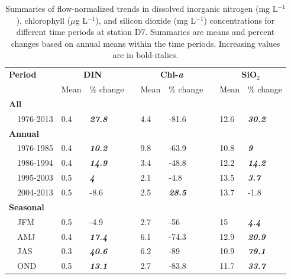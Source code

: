 \documentclass[letterpaper,12pt,oneside]{article}\usepackage[]{graphicx}\usepackage[]{color}
\begin{document}
\begin{table}[!tbp]
\caption{Summaries of flow-normalized trends in dissolved inorganic nitrogen (mg L$^{-1}$), chlorophyll ($\mu$g L$^{-1}$), and silicon dioxide (mg L$^{-1}$) concentrations for different time periods at station D7. Summaries are means and percent changes based on annual means within the time periods.  Increasing values are in bold-italics.\label{tab:d7chg}} 
\begin{center}
\begin{tabular}{lllcllcll}
\hline\hline
\multicolumn{1}{l}{\bfseries Period}&\multicolumn{2}{c}{\bfseries DIN}&\multicolumn{1}{c}{\bfseries }&\multicolumn{2}{c}{\bfseries Chl-\textit{a}}&\multicolumn{1}{c}{\bfseries }&\multicolumn{2}{c}{\bfseries SiO$_2$}\tabularnewline
\cline{2-3} \cline{5-6} \cline{8-9}
\multicolumn{1}{l}{}&\multicolumn{1}{c}{Mean}&\multicolumn{1}{c}{\% change}&\multicolumn{1}{c}{}&\multicolumn{1}{c}{Mean}&\multicolumn{1}{c}{\% change}&\multicolumn{1}{c}{}&\multicolumn{1}{c}{Mean}&\multicolumn{1}{c}{\% change}\tabularnewline
\hline
{\bfseries All}&&&&&&&&\tabularnewline
~~1976-2013&0.4&\textit{\textbf{27.8}}&&4.4&-81.6&&12.6&\textit{\textbf{30.2}}\tabularnewline
\hline
{\bfseries Annual}&&&&&&&&\tabularnewline
~~1976-1985&0.4&\textit{\textbf{10.2}}&&9.8&-63.9&&10.8&\textit{\textbf{9}}\tabularnewline
~~1986-1994&0.4&\textit{\textbf{14.9}}&&3.4&-48.8&&12.2&\textit{\textbf{14.2}}\tabularnewline
~~1995-2003&0.5&\textit{\textbf{4}}&&2.1&-4.8&&13.5&\textit{\textbf{3.7}}\tabularnewline
~~2004-2013&0.5&-8.6&&2.5&\textit{\textbf{28.5}}&&13.7&-1.8\tabularnewline
\hline
{\bfseries Seasonal}&&&&&&&&\tabularnewline
~~JFM&0.5&-4.9&&2.7&-56&&15&\textit{\textbf{4.4}}\tabularnewline
~~AMJ&0.4&\textit{\textbf{17.4}}&&6.1&-74.3&&12.9&\textit{\textbf{20.9}}\tabularnewline
~~JAS&0.3&\textit{\textbf{40.6}}&&6.2&-89&&10.9&\textit{\textbf{79.1}}\tabularnewline
~~OND&0.5&\textit{\textbf{13.1}}&&2.7&-83.8&&11.7&\textit{\textbf{33.7}}\tabularnewline
\hline
\end{tabular}\end{center}

\end{table}
\end{document}
